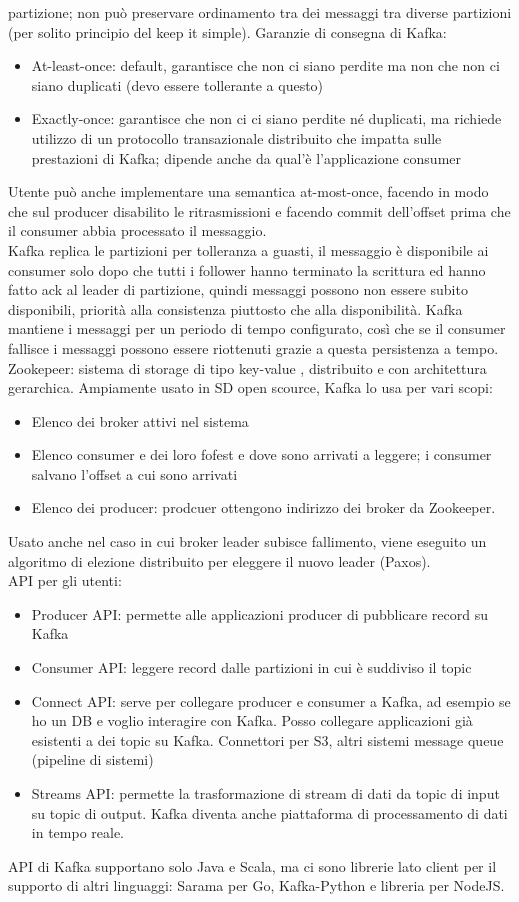 \documentclass{article}
\begin{document}
partizione; non può preservare ordinamento tra dei messaggi tra diverse partizioni (per solito principio del keep it simple). Garanzie di consegna di Kafka:
\begin{itemize}
\item At-least-once: default, garantisce che non ci siano perdite ma non che non ci siano duplicati (devo essere tollerante a questo)
\item Exactly-once: garantisce che non ci ci siano perdite né duplicati, ma richiede utilizzo di un protocollo transazionale distribuito che impatta sulle prestazioni di Kafka; dipende anche da qual'è l'applicazione consumer
\end{itemize}
Utente può anche implementare una semantica at-most-once, facendo in modo che sul producer disabilito le ritrasmissioni e facendo commit dell'offset prima che il consumer abbia processato il messaggio.\\ Kafka replica le partizioni per tolleranza a guasti, il messaggio è disponibile ai consumer solo dopo che tutti i follower hanno terminato la scrittura ed hanno fatto ack al leader di partizione, quindi messaggi possono non essere subito disponibili, priorità alla consistenza piuttosto che alla disponibilità. Kafka mantiene i messaggi per un periodo di tempo configurato, così che se il consumer fallisce i messaggi possono essere riottenuti grazie a questa persistenza a tempo.\\ Zookepeer: sistema di storage di tipo key-value , distribuito e con architettura gerarchica. Ampiamente usato in SD open scource, Kafka lo usa per vari scopi:
\begin{itemize}
\item Elenco dei broker attivi nel sistema
\item Elenco consumer e dei loro fofest e dove sono arrivati a leggere; i consumer salvano l'offset a cui sono arrivati
\item Elenco dei producer: prodcuer ottengono indirizzo dei broker da Zookeeper.
\end{itemize}
Usato anche nel caso in cui broker leader subisce fallimento, viene eseguito un algoritmo di elezione distribuito per eleggere il nuovo leader (Paxos).\\ API per gli utenti:
\begin{itemize}
\item Producer API: permette alle applicazioni producer di pubblicare record su Kafka
\item Consumer API: leggere record dalle partizioni in cui è suddiviso il topic
\item Connect API: serve per collegare producer e consumer a Kafka, ad esempio se ho un DB e voglio interagire con Kafka. Posso collegare applicazioni già esistenti a dei topic su Kafka. Connettori per S3, altri sistemi message queue (pipeline di sistemi)
\item Streams API: permette la trasformazione di stream di dati da topic di input su topic di output. Kafka diventa anche piattaforma di processamento di dati in tempo reale.
\end{itemize}
API di Kafka supportano solo Java e Scala, ma ci sono librerie lato client per il supporto di altri linguaggi: Sarama per Go, Kafka-Python e libreria per NodeJS.
\end{document}
